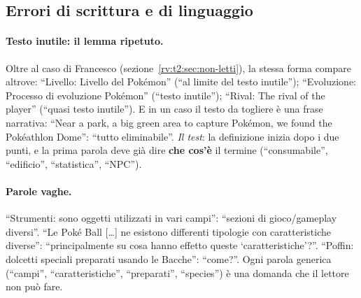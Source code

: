 \subsection{Errori di scrittura e di linguaggio}
\label{rv:t2:sec:linguaggio}

\paragraph{Testo inutile: il lemma ripetuto.} Oltre al caso di Francesco
(sezione~\ref{rv:t2:sec:non-letti}), la stessa forma compare altrove:
``Livello: Livello del Pokémon'' (``al limite del testo inutile'');
``Evoluzione: Processo di evoluzione Pokémon'' (``testo inutile''); ``Rival:
The rival of the player'' (``quasi testo inutile''). E in un caso il
testo da togliere è una frase narrativa: ``Near a park, a big green area to
capture Pokémon, we found the Pokéathlon Dome'': ``tutto eliminabile''.
\emph{Il test}: la definizione inizia dopo i due punti, e la prima parola
deve già dire \textbf{che cos'è} il termine (``consumabile'', ``edificio'',
``statistica'', ``NPC'').

\paragraph{Parole vaghe.} ``Strumenti: sono oggetti utilizzati in vari
campi'': ``sezioni di gioco/gameplay diversi''. ``Le Poké Ball [\dots] ne
esistono differenti tipologie con caratteristiche diverse'': ``principalmente
su cosa hanno effetto queste `caratteristiche'?''. ``Poffin: dolcetti
speciali preparati usando le Bacche'': ``come?''. Ogni parola generica
(``campi'', ``caratteristiche'', ``preparati'', ``species'') è una domanda che
il lettore non può fare.

